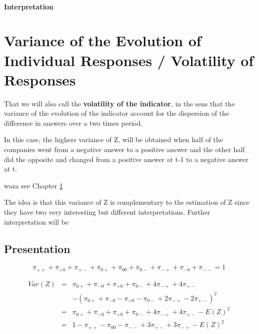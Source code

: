 \documentclass[12pt,a4paper,oneside]{book}
\begin{document}
\subsubsection{Interpretation}





\chapter{Variance of the Evolution of Individual Responses / Volatility of Responses} \label{Chapter:Z}

That we will also call the \textbf{volatility of the indicator}, in the sens that the variance of the evolution of the indicator account for the dispersion of the difference in answers over a two times period.

In this case, the highers variance of Z, will be obtained when half of the companies went from a negative answer to a positive answer and the other half did the opposite and changed from a positive answer at t-1 to a negative answer at t. 

waza see Chapter \ref{Chapter:Z}

The idea is that this variance of Z is complementary to the estimation of Z since they have two very interesting but different interpretations.
Further interpretation will be 

\section{Presentation}



\begin{equation}
\pi_{++} + \pi_{+0} + \pi_{+-} + \pi_{0+} + \pi_{00} + \pi_{0-} + \pi_{-+} + \pi_{-0} + \pi_{--} = 1 
\end{equation}

\begin{eqnarray}
Var(Z) &=& \pi_{0+} + \pi_{-0} + \pi_{+0} + \pi_{0-} +4\pi_{-+} +4\pi_{+-} \nonumber \nonumber \\ 
&&	- (\pi_{0+} + \pi_{-0} - \pi_{+0} - \pi_{0-} +2\pi_{-+} -2\pi_{+-})^2 \nonumber \\
&=& \pi_{0+} + \pi_{-0} + \pi_{+0} + \pi_{0-} +4\pi_{-+} +4\pi_{+-} - E(Z)^2 \nonumber \\
&=& 1 - \pi_{++} - \pi_{00} - \pi_{--} + 3\pi_{+-} + 3\pi_{-+} - E(Z)^2
\end{eqnarray}
\end{document}
